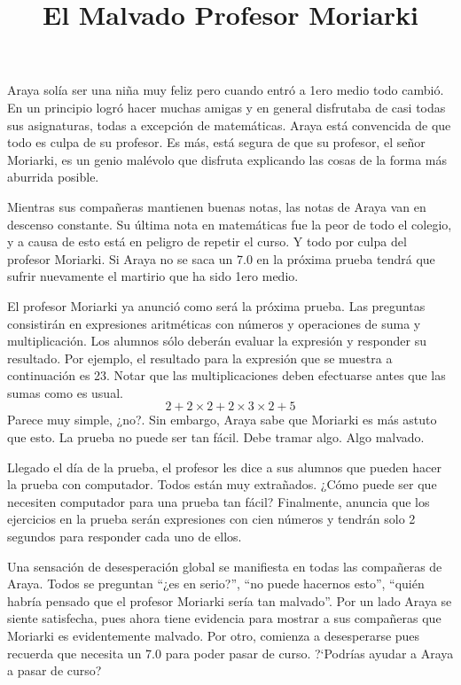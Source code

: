 \documentclass{oci}
\title{El Malvado Profesor Moriarki}
\begin{document}
\begin{problemDescription}
Araya solía ser una niña muy feliz pero cuando entró a 1ero medio todo cambió.
En un principio logró hacer muchas amigas y en general disfrutaba de casi todas
sus asignaturas, todas a excepción de matemáticas.
Araya está convencida de que todo es culpa de su profesor.
Es más, está segura de que su profesor, el señor Moriarki, es un genio malévolo
que disfruta explicando las cosas de la forma más aburrida posible.

Mientras sus compañeras mantienen buenas notas, las notas de Araya van en
descenso constante.
Su última nota en matemáticas fue la peor de todo el colegio, y a causa de esto
está en peligro de repetir el curso.
Y todo por culpa del profesor Moriarki.
Si Araya no se saca un 7.0 en la próxima prueba tendrá que sufrir nuevamente el
martirio que ha sido 1ero medio.

El profesor Moriarki ya anunció como será la próxima prueba.
Las preguntas consistirán en expresiones aritméticas con números y operaciones
de suma y multiplicación.
Los alumnos sólo deberán evaluar la expresión y responder su resultado.
Por ejemplo, el resultado para la expresión que se muestra a continuación es 23.
Notar que las multiplicaciones deben efectuarse antes que las sumas como es usual.
$$
2 + 2 \times 2 + 2\times 3 \times 2 + 5
$$
Parece muy simple, ¿no?.
Sin embargo, Araya sabe que Moriarki es más astuto que 	esto.
La prueba no puede ser tan fácil.
Debe tramar algo.
Algo malvado.

Llegado el día de la prueba, el profesor les dice a sus alumnos que pueden hacer
la prueba con computador.
Todos están muy extrañados.
¿Cómo puede ser que necesiten computador para una prueba tan fácil?
Finalmente, anuncia que los ejercicios en la prueba serán expresiones con cien
números y tendrán solo 2 segundos para responder cada uno de ellos.

Una sensación de desesperación global se manifiesta en todas las compañeras de
Araya.
Todos se preguntan ``¿es en serio?'', ``no puede hacernos esto'', ``quién
habría pensado que el profesor Moriarki sería tan malvado''.
Por un lado Araya se siente satisfecha, pues ahora tiene evidencia para mostrar a sus
compañeras que Moriarki es evidentemente malvado.
Por otro, comienza a desesperarse pues recuerda que necesita un 7.0 para poder
pasar de curso.
?`Podrías ayudar a Araya a pasar de curso?


\end{problemDescription}
\end{document}
